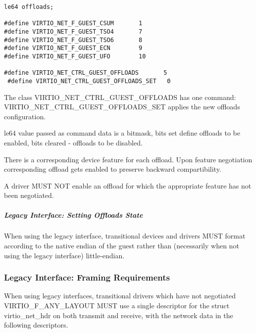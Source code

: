 \begin{lstlisting}
le64 offloads;

#define VIRTIO_NET_F_GUEST_CSUM       1
#define VIRTIO_NET_F_GUEST_TSO4       7
#define VIRTIO_NET_F_GUEST_TSO6       8
#define VIRTIO_NET_F_GUEST_ECN        9
#define VIRTIO_NET_F_GUEST_UFO        10

#define VIRTIO_NET_CTRL_GUEST_OFFLOADS       5
 #define VIRTIO_NET_CTRL_GUEST_OFFLOADS_SET   0
\end{lstlisting}

The class VIRTIO_NET_CTRL_GUEST_OFFLOADS has one command:
VIRTIO_NET_CTRL_GUEST_OFFLOADS_SET applies the new offloads configuration.

le64 value passed as command data is a bitmask, bits set define
offloads to be enabled, bits cleared - offloads to be disabled.

There is a corresponding device feature for each offload. Upon feature
negotiation corresponding offload gets enabled to preserve backward
compartibility.


A driver MUST NOT enable an offload for which the appropriate feature
has not been negotiated.

\subparagraph{Legacy Interface: Setting Offloads State}\label{sec:Device Types / Network Device / Device Operation / Control Virtqueue / Offloads State Configuration / Setting Offloads State / Legacy Interface: Setting Offloads State}
When using the legacy interface, transitional devices and drivers
MUST format 
according to the native endian of the guest rather than
(necessarily when not using the legacy interface) little-endian.


\subsubsection{Legacy Interface: Framing Requirements}\label{sec:Device
Types / Network Device / Legacy Interface: Framing Requirements}

When using legacy interfaces, transitional drivers which have not
negotiated VIRTIO_F_ANY_LAYOUT MUST use a single descriptor for the
struct virtio_net_hdr on both transmit and receive, with the
network data in the following descriptors.

